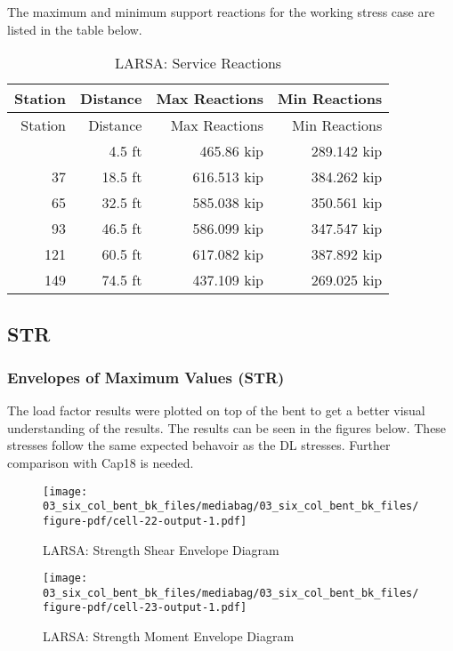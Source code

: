 \documentclass[
  letterpaper,
  DIV=11,
  numbers=noendperiod]{scrartcl}
\begin{document}
The maximum and minimum support reactions for the working stress case
are listed in the table below.

\begin{longtable}[]{@{}rrrr@{}}
\caption{LARSA: Service Reactions}\tabularnewline
\toprule\noalign{}
Station & Distance & Max Reactions & Min Reactions \\
\midrule\noalign{}
\endfirsthead
\toprule\noalign{}
Station & Distance & Max Reactions & Min Reactions \\
\midrule\noalign{}
\endhead
\bottomrule\noalign{}
\endlastfoot
9 & 4.5 ft & 465.86 kip & 289.142 kip \\
37 & 18.5 ft & 616.513 kip & 384.262 kip \\
65 & 32.5 ft & 585.038 kip & 350.561 kip \\
93 & 46.5 ft & 586.099 kip & 347.547 kip \\
121 & 60.5 ft & 617.082 kip & 387.892 kip \\
149 & 74.5 ft & 437.109 kip & 269.025 kip \\
\end{longtable}

\newpage{}

\subsection{STR}\label{str-1}

\subsubsection{Envelopes of Maximum Values
(STR)}\label{envelopes-of-maximum-values-str-1}

The load factor results were plotted on top of the bent to get a better
visual understanding of the results. The results can be seen in the
figures below. These stresses follow the same expected behavoir as the
DL stresses. Further comparison with Cap18 is needed.

\begin{figure}[H]

{\centering \texttt{[image: 03\_six\_col\_bent\_bk\_files/mediabag/03\_six\_col\_bent\_bk\_files/figure-pdf/cell-22-output-1.pdf]}

}

\caption{LARSA: Strength Shear Envelope Diagram}

\end{figure}%

\begin{figure}[H]

{\centering \texttt{[image: 03\_six\_col\_bent\_bk\_files/mediabag/03\_six\_col\_bent\_bk\_files/figure-pdf/cell-23-output-1.pdf]}

}

\caption{LARSA: Strength Moment Envelope Diagram}

\end{figure}%
\end{document}
